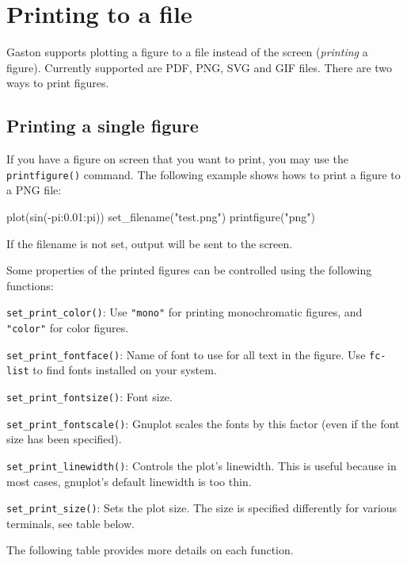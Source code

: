 \documentclass[11pt]{article}
\newcommand{\cmd}[1]{\texttt{#1}}
\begin{document}
\section{Printing to a file}
\label{s:print}

Gaston supports plotting a figure to a file instead of the screen
(\textit{printing} a figure). Currently supported are PDF, PNG,  SVG and GIF
files. There are two ways to print figures.

\subsection{Printing a single figure}

If you have a figure on screen that you want to print, you may use the
\cmd{printfigure()} command. The following example shows hows to print a figure
to a PNG file:

\begin{juliacode}
plot(sin(-pi:0.01:pi))
set_filename("test.png")
printfigure("png")
\end{juliacode}

If the filename is not set, output will be sent to the screen.

Some properties of the printed figures can be controlled using the following
functions:

\cmd{set\_print\_color()}: Use \cmd{"mono"} for printing monochromatic figures,
and \cmd{"color"} for color figures.

\cmd{set\_print\_fontface()}: Name of font to use for all text in the figure. Use
\cmd{fc-list} to find fonts installed on your system.

\cmd{set\_print\_fontsize()}: Font size.

\cmd{set\_print\_fontscale()}: Gnuplot scales the fonts by this factor (even
if the font size has been specified).

\cmd{set\_print\_linewidth()}: Controls the plot's linewidth. This is useful
because in most cases, gnuplot's default linewidth is too thin.

\cmd{set\_print\_size()}: Sets the plot size. The size is specified differently
for various terminals, see table below.

The following table provides more details on each function.
\end{document}
